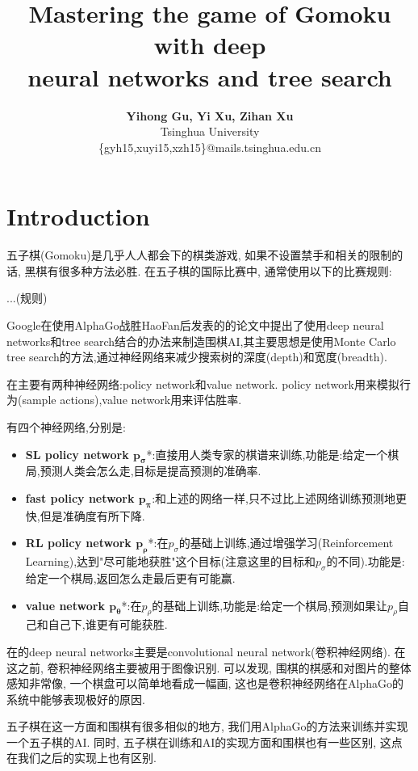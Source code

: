 \documentclass[twocolumn]{article}
\title{\LARGE\textbf{Mastering the game of Gomoku with deep \\ neural networks and tree search} \\}
\author{\textbf{Yihong Gu, Yi Xu, Zihan Xu}\\ Tsinghua University \\ \normalsize\ttfamily\selectfont\{gyh15,xuyi15,xzh15\}@mails.tsinghua.edu.cn}
\date{}
\begin{document}
\maketitle

\section{Introduction}

五子棋(Gomoku)是几乎人人都会下的棋类游戏, 如果不设置禁手和相关的限制的话, 黑棋有很多种方法必胜. 在五子棋的国际比赛中, 通常使用以下的比赛规则: 

\textcolor[rgb]{1,0,0}{...(规则)}

Google在使用AlphaGo战胜HaoFan后发表的\cite{alphago}的论文中提出了使用deep neural networks和tree search结合的办法来制造围棋AI,其主要思想是使用Monte Carlo tree search的方法,通过神经网络来减少搜索树的深度(depth)和宽度(breadth).

在\cite{alphago}主要有两种神经网络:policy network和value network. policy network用来模拟行为(sample actions),value network用来评估胜率.

有四个神经网络,分别是:

\begin{itemize}
	\item \textbf{SL policy network $\bm{p_\sigma}$}*:直接用人类专家的棋谱来训练,功能是:给定一个棋局,预测人类会怎么走,目标是提高预测的准确率.
	\item \textbf{fast policy network $\bm{p_\pi}$}:和上述的网络一样,只不过比上述网络训练预测地更快,但是准确度有所下降.
	\item \textbf{RL policy network $\bm{p_\rho}$}*:在$p_\sigma$的基础上训练,通过增强学习(Reinforcement Learning),达到"尽可能地获胜"这个目标(注意这里的目标和$p_\sigma$的不同).功能是:给定一个棋局,返回怎么走最后更有可能赢.
	\item \textbf{value network $\bm{p_\theta}$}*:在$p_\rho$的基础上训练,功能是:给定一个棋局,预测如果让$p_\rho$自己和自己下,谁更有可能获胜.
\end{itemize}

在\cite{alphago}的deep neural networks主要是convolutional neural network(卷积神经网络). 在这之前, 卷积神经网络主要被用于图像识别. 可以发现, 围棋的棋感和对图片的整体感知非常像, 一个棋盘可以简单地看成一幅画, 这也是卷积神经网络在AlphaGo的系统中能够表现极好的原因.

五子棋在这一方面和围棋有很多相似的地方, 我们用AlphaGo的方法来训练并实现一个五子棋的AI. 同时, 五子棋在训练和AI的实现方面和围棋也有一些区别, 这点在我们之后的实现上也有区别. 
\end{document}
